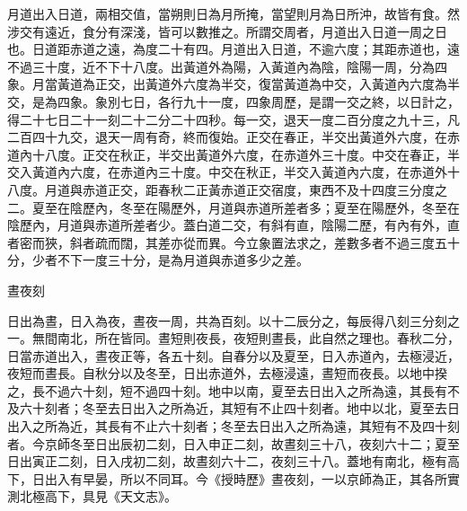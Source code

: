 \begin{pinyinscope}
 月道出入日道，兩相交值，當朔則日為月所掩，當望則月為日所沖，故皆有食。然涉交有遠近，食分有深淺，皆可以數推之。所謂交周者，月道出入日道一周之日也。日道距赤道之遠，為度二十有四。月道出入日道，不逾六度；其距赤道也，遠不過三十度，近不下十八度。出黃道外為陽，入黃道內為陰，陰陽一周，分為四象。月當黃道為正交，出黃道外六度為半交，復當黃道為中交，入黃道內六度為半交，是為四象。象別七日，各行九十一度，四象周歷，是謂一交之終，以日計之，得二十七日二十一刻二十二分二十四秒。每一交，退天一度二百分度之九十三，凡二百四十九交，退天一周有奇，終而復始。正交在春正，半交出黃道外六度，在赤道內十八度。正交在秋正，半交出黃道外六度，在赤道外三十度。中交在春正，半交入黃道內六度，在赤道內三十度。中交在秋正，半交入黃道內六度，在赤道外十八度。月道與赤道正交，距春秋二正黃赤道正交宿度，東西不及十四度三分度之二。夏至在陰歷內，冬至在陽歷外，月道與赤道所差者多；夏至在陽歷外，冬至在陰歷內，月道與赤道所差者少。蓋白道二交，有斜有直，陰陽二歷，有內有外，直者密而狹，斜者疏而闊，其差亦從而異。今立象置法求之，差數多者不過三度五十分，少者不下一度三十分，是為月道與赤道多少之差。



 晝夜刻



 日出為晝，日入為夜，晝夜一周，共為百刻。以十二辰分之，每辰得八刻三分刻之一。無間南北，所在皆同。晝短則夜長，夜短則晝長，此自然之理也。春秋二分，日當赤道出入，晝夜正等，各五十刻。自春分以及夏至，日入赤道內，去極浸近，夜短而晝長。自秋分以及冬至，日出赤道外，去極浸遠，晝短而夜長。以地中揆之，長不過六十刻，短不過四十刻。地中以南，夏至去日出入之所為遠，其長有不及六十刻者；冬至去日出入之所為近，其短有不止四十刻者。地中以北，夏至去日出入之所為近，其長有不止六十刻者；冬至去日出入之所為遠，其短有不及四十刻者。今京師冬至日出辰初二刻，日入申正二刻，故晝刻三十八，夜刻六十二；夏至日出寅正二刻，日入戌初二刻，故晝刻六十二，夜刻三十八。蓋地有南北，極有高下，日出入有早晏，所以不同耳。今《授時歷》晝夜刻，一以京師為正，其各所實測北極高下，具見《天文志》。



\end{pinyinscope}